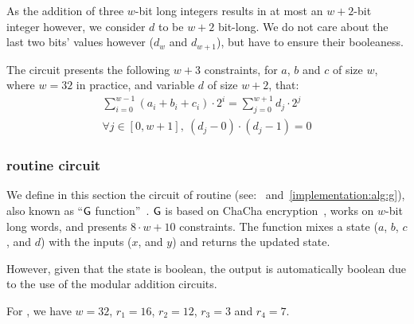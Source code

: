 As the addition of three $w$-bit long integers results in at most an $w+2$-bit integer however, we consider $d$ to be $w+2$ bit-long. We do not care about the last two bits' values however ($d_w$ and $d_{w+1}$), but have to ensure their booleaness.

The circuit presents the following $w+3$ constraints, for $a$, $b$ and $c$ of size $w$, where $w=32$ in practice, and variable $d$ of size $w+2$, that:
\begin{align}
  \sum_{i=0}^{w - 1} \left( a_i + b_i + c_i \right ) \cdot 2^i = \sum_{j=0}^{w+1} d_j \cdot 2^j \label{implementation:eq:triple_modular_sum} \\
  \forall j \in [ 0, w+1 ],\ (d_j - 0) \cdot (d_j - 1) = 0 \label{implementation:eq:triple_modular_bool}
\end{align}

\subsubsection{ routine circuit}\label{implementation:efficiency:blake:g-circuit}

We define in this section the circuit of  routine (see:~\cite[Section 3.1]{blakecompietf} and~\cref{implementation:alg:g}), also known as ``$\mathsf{G}$ function''~\cite[Section 2.4]{aumasson2013blake2}. $\mathsf{G}$ is based on ChaCha encryption~\cite{bernstein2008chacha}, works on $w$-bit long words, and presents $8 \cdot w+10$ constraints. The function mixes a state ($a$, $b$, $c$, and $d$) with the inputs ($x$, and $y$) and returns the updated state.

 However, given that the state is boolean, the output is automatically boolean due to the use of the modular addition circuits.

For , we have $w=32$, $r_1=16$, $r_2 = 12$, $r_3=3$ and $r_4=7$.

